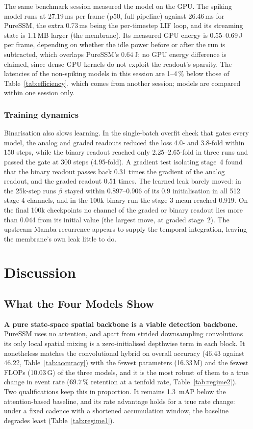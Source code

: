 \documentclass[11pt, a4paper]{report}
\begin{document}
The same benchmark session measured the model on the GPU. The spiking model runs at 27.19\,ms per frame
(p50, full pipeline) against 26.46\,ms for PureSSM, the extra 0.73\,ms being the per-timestep LIF loop, and
its streaming state is 1.1\,MB larger (the membrane). Its measured GPU energy is 0.55--0.69\,J per frame,
depending on whether the idle power before or after the run is subtracted, which overlaps PureSSM's
0.64\,J; no GPU energy difference is claimed, since dense GPU kernels do not exploit the readout's sparsity.
The latencies of the non-spiking models in this session are 1--4\,\% below those of
Table~\ref{tab:efficiency}, which comes from another session; models are compared within one session only.

\subsection{Training dynamics}
\label{subsec:spk_dynamics}
Binarisation also slows learning. In the single-batch overfit check that gates every model, the analog and
graded readouts reduced the loss 4.0- and 3.8-fold within 150 steps, while the binary readout reached only
2.25--2.65-fold in three runs and passed the gate at 300 steps (4.95-fold). A gradient test isolating
stage~4 found that the binary readout passes back 0.31 times the gradient of the analog readout, and the
graded readout 0.51 times. The learned leak barely moved: in the 25k-step runs $\beta$ stayed within
0.897--0.906 of its 0.9 initialisation in all 512 stage-4 channels, and in the 100k binary run the stage-3 mean
reached 0.919. On the final 100k checkpoints no channel of the graded or binary readout lies more than
0.044 from its initial value (the largest move, at graded stage~2). The upstream Mamba recurrence appears to
supply the temporal integration, leaving the membrane's own leak little to do.


\chapter{Discussion}
\label{ch:discussion}

\section{What the Four Models Show}
\label{sec:what_shown}
\textbf{A pure state-space spatial backbone is a viable detection backbone.} PureSSM uses no attention,
and apart from strided downsampling convolutions its only local spatial mixing is a zero-initialised
depthwise term in each block. It nonetheless
matches the convolutional hybrid on overall accuracy (46.43 against 46.22, Table~\ref{tab:accuracy})
with the fewest parameters (16.33\,M) and the fewest FLOPs (10.03\,G) of the three models, and it is the
most robust of them to a true change in event rate (69.7\,\% retention at a tenfold rate,
Table~\ref{tab:regime2}). Two qualifications keep this in proportion. It remains 1.3~mAP below the
attention-based baseline, and its rate advantage holds for a true rate change: under a fixed cadence
with a shortened accumulation window, the baseline degrades least (Table~\ref{tab:regime1}).
\end{document}
